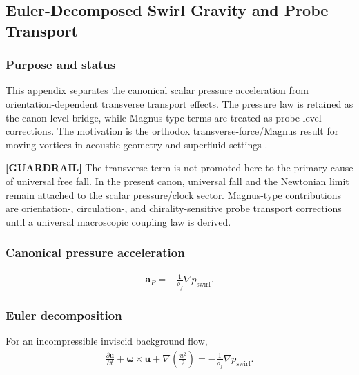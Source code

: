\subsection{Euler-Decomposed Swirl Gravity and Probe Transport}
\label{sec:appendix_euler_probe_transport}

\subsubsection{Purpose and status}
    This appendix separates the canonical scalar pressure acceleration from
    orientation-dependent transverse transport effects. The pressure law is retained
    as the canon-level bridge, while Magnus-type terms are treated as probe-level
    corrections. The motivation is the orthodox transverse-force/Magnus result for
    moving vortices in acoustic-geometry and superfluid settings
    \cite{Zhang2005TransverseForce,Saffman1992}.

    \textbf{[GUARDRAIL]} The transverse term is not promoted here to the primary
    cause of universal free fall. In the present canon, universal fall and the
    Newtonian limit remain attached to the scalar pressure/clock sector. Magnus-type
    contributions are orientation-, circulation-, and chirality-sensitive probe
    transport corrections until a universal macroscopic coupling law is derived.

\subsubsection{Canonical pressure acceleration}
    \begin{align}
        \mathbf{a}_{P}
        =
        -\frac{1}{\rho_{\!f}}\nabla p_{\mathrm{swirl}}.
        \label{eq:rt_scalar_pressure_acceleration}
    \end{align}

\subsubsection{Euler decomposition}
    For an incompressible inviscid background flow,
    \begin{align}
        \frac{\partial \mathbf{u}}{\partial t}
        +
        \boldsymbol{\omega}\times\mathbf{u}
        +
        \nabla\left(\frac{u^2}{2}\right)
        =
        -\frac{1}{\rho_{\!f}}\nabla p_{\mathrm{swirl}}.
        \label{eq:rt_euler_decomposed_swirl_balance}
    \end{align}

